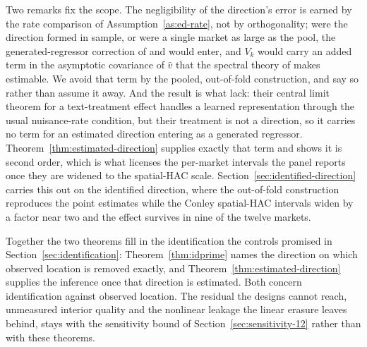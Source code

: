 Two remarks fix the scope. The negligibility of the direction's error is earned by the
rate comparison of Assumption~\ref{as:ed-rate}, not by orthogonality; were the
direction formed in sample, or were a single market as large as the pool, the
generated-regressor correction of \citet{pagan1984econometric} and
\citet{hahn2013asymptotic} would enter, and $V_k$ would carry an added term in the
asymptotic covariance of $\hat v$ that the spectral theory of
\citet{koltchinskii2016asymptotics} makes estimable. We avoid that term by the pooled,
out-of-fold construction, and say so rather than assume it away. And the result is what
\citet{guiveitch2023} lack: their central limit theorem for a text-treatment effect
handles a learned representation through the usual nuisance-rate condition, but their
treatment is not a direction, so it carries no term for an estimated direction entering
as a generated regressor. Theorem~\ref{thm:estimated-direction} supplies exactly that
term and shows it is second order, which is what licenses the per-market intervals the
panel reports once they are widened to the spatial-HAC scale.
Section~\ref{sec:identified-direction} carries this out on the identified direction,
where the out-of-fold construction reproduces the point estimates while the Conley
spatial-HAC intervals widen by a factor near two and the effect survives in nine of
the twelve markets.

Together the two theorems fill in the identification the controls promised in
Section~\ref{sec:identification}: Theorem~\ref{thm:idprime} names the direction on
which observed location is removed exactly, and
Theorem~\ref{thm:estimated-direction} supplies the inference once that direction is
estimated. Both concern identification against observed location. The residual the
designs cannot reach, unmeasured interior quality and the nonlinear leakage the linear
erasure leaves behind, stays with the sensitivity bound of
Section~\ref{sec:sensitivity-12} rather than with these theorems.
